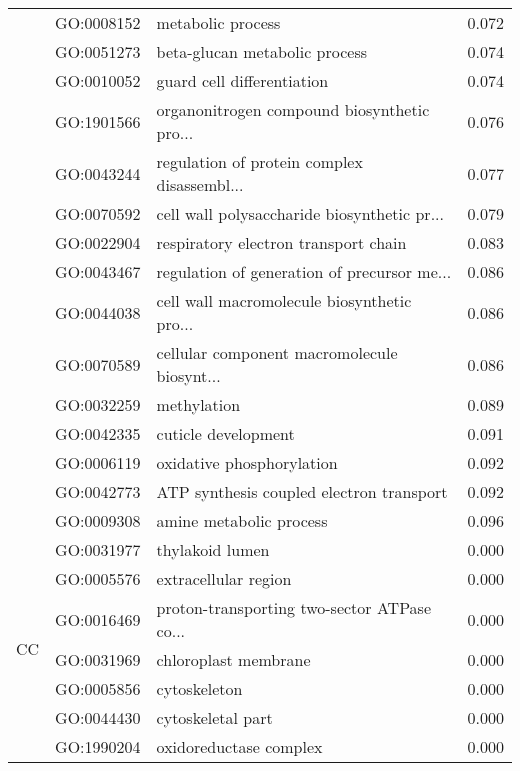 \begin{longtable}{lllr}
   & GO:0008152 &                            metabolic process &         0.072 \\
   & GO:0051273 &                beta-glucan metabolic process &         0.074 \\
   & GO:0010052 &                   guard cell differentiation &         0.074 \\
   & GO:1901566 &  organonitrogen compound biosynthetic pro... &         0.076 \\
   & GO:0043244 &  regulation of protein complex disassembl... &         0.077 \\
   & GO:0070592 &  cell wall polysaccharide biosynthetic pr... &         0.079 \\
   & GO:0022904 &         respiratory electron transport chain &         0.083 \\
   & GO:0043467 &  regulation of generation of precursor me... &         0.086 \\
   & GO:0044038 &  cell wall macromolecule biosynthetic pro... &         0.086 \\
   & GO:0070589 &  cellular component macromolecule biosynt... &         0.086 \\
   & GO:0032259 &                                  methylation &         0.089 \\
   & GO:0042335 &                          cuticle development &         0.091 \\
   & GO:0006119 &                    oxidative phosphorylation &         0.092 \\
   & GO:0042773 &     ATP synthesis coupled electron transport &         0.092 \\
   & GO:0009308 &                      amine metabolic process &         0.096 \\
\cline{1-4}
\multirow{40}{*}{CC} & GO:0031977 &                              thylakoid lumen &         0.000 \\
   & GO:0005576 &                         extracellular region &         0.000 \\
   & GO:0016469 &  proton-transporting two-sector ATPase co... &         0.000 \\
   & GO:0031969 &                         chloroplast membrane &         0.000 \\
   & GO:0005856 &                                 cytoskeleton &         0.000 \\
   & GO:0044430 &                            cytoskeletal part &         0.000 \\
   & GO:1990204 &                       oxidoreductase complex &         0.000 \\

\end{longtable}
